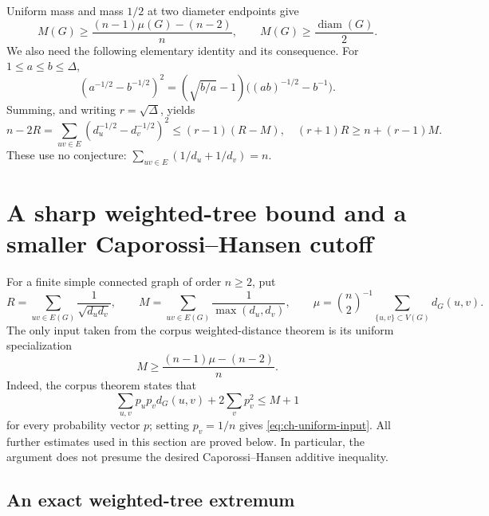 \documentclass[11pt,a4paper]{article}
\theoremstyle{definition}
\theoremstyle{remark}
\DeclareMathOperator{\diam}{diam}
\numberwithin{equation}{section}
\begin{document}
Uniform mass and mass $1/2$ at two diameter endpoints give
\begin{equation}
 M(G)\ge\frac{(n-1)\mu(G)-(n-2)}n,\qquad M(G)\ge\frac{\diam(G)}2.
 \label{eq:uniform-input}
\end{equation}
We also need the following elementary identity and its consequence.
For $1\le a\le b\le\Delta$,
\[
(a^{-1/2}-b^{-1/2})^2
 =(\sqrt{b/a}-1)\bigl((ab)^{-1/2}-b^{-1}\bigr).
\]
Summing, and writing $r=\sqrt\Delta$, yields
\begin{equation}
 n-2R=\sum_{uv\in E}(d_u^{-1/2}-d_v^{-1/2})^2
 \le (r-1)(R-M),
 \quad (r+1)R\ge n+(r-1)M.
 \label{eq:bridge-input}
\end{equation}
These use no conjecture: $\sum_{uv\in E}(1/d_u+1/d_v)=n$.



\section{A sharp weighted-tree bound and a smaller Caporossi--Hansen cutoff}
\label{sec:ch-improved-cutoff}

For a finite simple connected graph of order $n\ge2$, put
\[
 R=\sum_{uv\in E(G)}\frac1{\sqrt{d_ud_v}},\qquad
 M=\sum_{uv\in E(G)}\frac1{\max(d_u,d_v)},\qquad
 \mu=\binom n2^{-1}\sum_{\{u,v\}\subset V(G)}d_G(u,v).
\]
The only input taken from the corpus weighted-distance theorem is its uniform
specialization
\begin{equation}\label{eq:ch-uniform-input}\tag{CH-U}
 M\ge \frac{(n-1)\mu-(n-2)}n.
\end{equation}
Indeed, the corpus theorem states that
\[
 \sum_{u,v}p_up_vd_G(u,v)+2\sum_vp_v^2\le M+1
\]
for every probability vector $p$; setting $p_v=1/n$ gives
\eqref{eq:ch-uniform-input}. All further estimates used in this section are
proved below. In particular, the argument does not presume the desired
Caporossi--Hansen additive inequality.

\subsection{An exact weighted-tree extremum}
\end{document}
